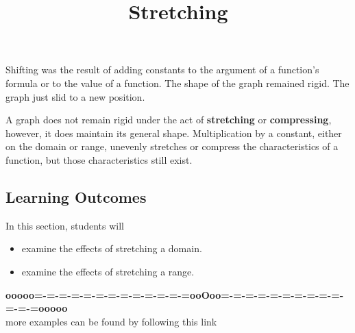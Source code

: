 \documentclass{ximera}
\title{Stretching}
\begin{document}
\begin{abstract}
\end{abstract}
\maketitle




Shifting was the result of adding constants to the argument of a function's formula or to the value of a function.  The shape of the graph remained rigid. The graph just slid to a new position. 



A graph does not remain rigid under the act of \textbf{stretching} or \textbf{compressing}, however, it does maintain its general shape. Multiplication by a constant, either on the domain or range, unevenly stretches or compress the characteristics of a function, but those characteristics still exist.



















\subsection{Learning Outcomes}


\begin{sectionOutcomes}
In this section, students will 

\begin{itemize}
\item examine the effects of stretching a domain.
\item examine the effects of stretching a range.
\end{itemize}
\end{sectionOutcomes}









\begin{center}
\textbf{\textcolor{green!50!black}{ooooo=-=-=-=-=-=-=-=-=-=-=-=-=ooOoo=-=-=-=-=-=-=-=-=-=-=-=-=ooooo}} \\

more examples can be found by following this link\\ 

\end{center}
\end{document}
